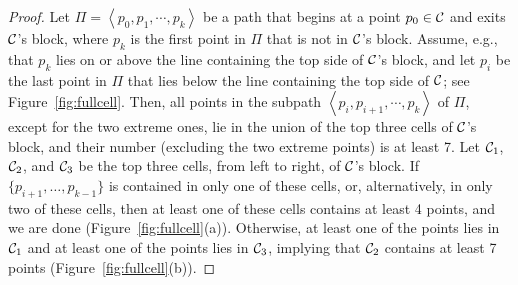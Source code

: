 \documentclass[11pt,letter]{article}
\newcommand{\old}[1]{{{}}}
\def\C{{\cal{C}}}
\begin{document}
\begin{proof}


\old{
Observe that since each cell is a semi-open square of side length $7$, then any path connecting two non-neighboring cells
contains at least $7$ middle-points.
Now, let $\pi = \left\langle p_0,p_1,\cdots,p_k\right\rangle$ be a path that begins at a point $p_0 \in \C$
and exits the block of $\C$, where $p_k$ is the first point along $\pi$ not in $\C$'s block.
Assume, e.g., that $p_k$ lies above $\C$'s block,
and let $p_i$ be the first point along $\pi$ for which the points $p_i, p_{i+1}, \cdots, p_k$ all lie above the cell $\C$.
By our observation at the beginning of the proof, $1 \leq i \leq 7$ (clearly $i >0$, and $p_{i-1}$ and $p_k$ lies in non-neighboring cells).
Let $\C_1$, $\C_2$, and $\C_3$
be the top cells in the block of $\C$, left to right,
then $p_i, p_{i+1}, \cdots, p_{k-1} \in \C_1 \cup \C_2 \cup \C_3$.
If these (at least $7$) points lies in one or in two of the three cells, then at least one cell contains at least $4$ points, namely is full.
Otherwise, there exists a subpath of $\left\langle p_i, p_{i+1}, \cdots, p_{k-1} \right\rangle$ that connects a point in $\C_1$ with a point in $\C_3$.
By our observation at the beginning of the proof,
such a path contains at least $7$ middle-points lying in $\C_2$, implying that $C_2$ in this case is full.
}

Let $\Pi = \left\langle p_0,p_1,\cdots,p_k\right\rangle$ be a path that begins at a point $p_0 \in \C$
and exits $\C$'s block, where $p_k$ is the first point in $\Pi$ that is not in $\C$'s block.
Assume, e.g., that $p_k$ lies on or above the line containing the top side of $\C$'s block,
and let $p_i$ be the last point in $\Pi$ that lies below the line containing the top side of $\C$; see Figure~\ref{fig:fullcell}.
Then, all points in the subpath
$\left\langle p_i,p_{i+1},\cdots,p_k\right\rangle$ of $\Pi$, except for the two extreme ones, lie in the union of the top three cells of $\C$'s block, and their number (excluding the two extreme points) is at least 7. Let $\C_1$, $\C_2$, and $\C_3$ be the top three cells, from left to right, of $\C$'s block. If $\{p_{i+1},\ldots,p_{k-1}\}$ is contained in only one of these cells, or, alternatively, in only two of these cells, then at least one of these cells contains at least 4 points, and we are done (Figure~\ref{fig:fullcell}(a)). Otherwise, at least one of the points lies in $\C_1$ and at least one of the points lies in $\C_3$, implying that $\C_2$ contains at least 7 points (Figure~\ref{fig:fullcell}(b)).



\end{proof}
\end{document}
